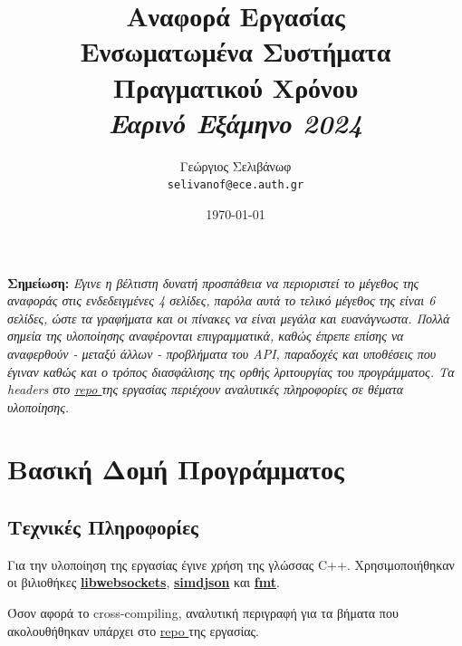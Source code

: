 \documentclass[12pt]{article}
\title{%
  Αναφορά Εργασίας \\[1em]
  \large Ενσωματωμένα Συστήματα Πραγματικού Χρόνου \\[2em]
  \textit{Εαρινό Εξάμηνο 2024} \vfill }
\author{Γεώργιος Σελιβάνωφ \\
  \texttt{selivanof@ece.auth.gr}}
\date{\today}
\newcommand{\repo}{\href{https://github.com/Selivanof/university-collection/tree/main/RealTime_Embedded_Systems}{repo }}
\begin{document}
\maketitle
\thispagestyle{empty}
\newpage


\tableofcontents
\begin{center}
    \textbf{Σημείωση:}
    \textit{Έγινε η βέλτιστη δυνατή προσπάθεια να περιοριστεί το μέγεθος της αναφοράς στις ενδεδειγμένες 4 σελίδες, παρόλα αυτά το τελικό μέγεθος της είναι 6 σελίδες, ώστε τα γραφήματα και οι πίνακες να είναι μεγάλα και ευανάγνωστα. Πολλά σημεία της υλοποίησης αναφέρονται επιγραμματικά, καθώς έπρεπε επίσης να αναφερθούν - μεταξύ άλλων - προβλήματα του API, παραδοχές και υποθέσεις που έγιναν καθώς και ο τρόπος διασφάλισης της ορθής λριτουργίας του προγράμματος. Τα headers στο \repo της εργασίας περιέχουν αναλυτικές πληροφορίες σε θέματα υλοποίησης.}
\end{center}
\thispagestyle{empty}
\newpage
\setcounter{page}{1}
\section{Βασική Δομή Προγράμματος}
\subsection{Τεχνικές Πληροφορίες}
Για την υλοποίηση της εργασίας έγινε χρήση της γλώσσας C++. Χρησιμοποιήθηκαν οι βιλιοθήκες \href{https://libwebsockets.org/}{\textbf{libwebsockets}}, \href{https://simdjson.org/}{\textbf{simdjson}} και \href{https://fmt.dev/}{\textbf{fmt}}.

Όσον αφορά το cross-compiling, αναλυτική περιγραφή για τα βήματα που ακολουθήθηκαν υπάρχει στο \repo της εργασίας.
\end{document}

